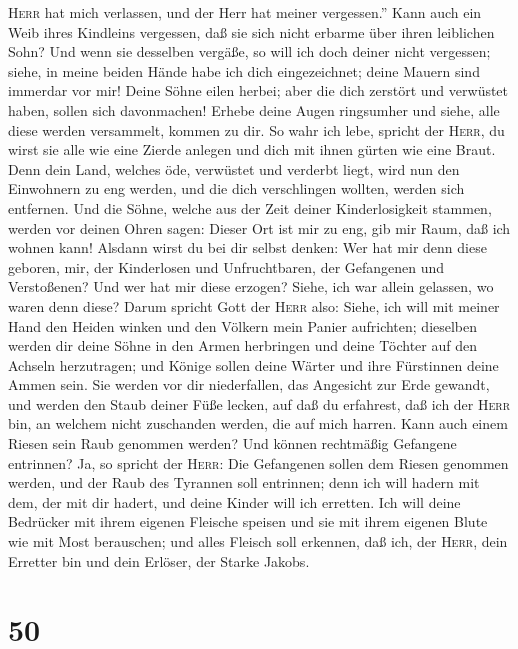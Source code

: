 \textsc{Herr} hat mich verlassen, und der Herr hat meiner vergessen.''
 Kann auch ein Weib ihres Kindleins vergessen, daß sie
sich nicht erbarme über ihren leiblichen Sohn? Und wenn sie desselben
vergäße, so will ich doch deiner nicht vergessen;  siehe,
in meine beiden Hände habe ich dich eingezeichnet; deine Mauern sind
immerdar vor mir!  Deine Söhne eilen herbei; aber die
dich zerstört und verwüstet haben, sollen sich davonmachen!
 Erhebe deine Augen ringsumher und siehe, alle diese
werden versammelt, kommen zu dir. So wahr ich lebe, spricht der
\textsc{Herr}, du wirst sie alle wie eine Zierde anlegen und dich mit
ihnen gürten wie eine Braut.  Denn dein Land, welches
öde, verwüstet und verderbt liegt, wird nun den Einwohnern zu eng
werden, und die dich verschlingen wollten, werden sich entfernen.
 Und die Söhne, welche aus der Zeit deiner
Kinderlosigkeit stammen, werden vor deinen Ohren sagen: Dieser Ort ist
mir zu eng, gib mir Raum, daß ich wohnen kann!  Alsdann
wirst du bei dir selbst denken: Wer hat mir denn diese geboren, mir, der
Kinderlosen und Unfruchtbaren, der Gefangenen und Verstoßenen? Und wer
hat mir diese erzogen? Siehe, ich war allein gelassen, wo waren denn
diese?  Darum spricht Gott der \textsc{Herr} also: Siehe,
ich will mit meiner Hand den Heiden winken und den Völkern mein Panier
aufrichten; dieselben werden dir deine Söhne in den Armen herbringen und
deine Töchter auf den Achseln herzutragen;  und Könige
sollen deine Wärter und ihre Fürstinnen deine Ammen sein. Sie werden vor
dir niederfallen, das Angesicht zur Erde gewandt, und werden den Staub
deiner Füße lecken, auf daß du erfahrest, daß ich der \textsc{Herr} bin,
an welchem nicht zuschanden werden, die auf mich harren. 
Kann auch einem Riesen sein Raub genommen werden? Und können rechtmäßig
Gefangene entrinnen?  Ja, so spricht der \textsc{Herr}:
Die Gefangenen sollen dem Riesen genommen werden, und der Raub des
Tyrannen soll entrinnen; denn ich will hadern mit dem, der mit dir
hadert, und deine Kinder will ich erretten.  Ich will
deine Bedrücker mit ihrem eigenen Fleische speisen und sie mit ihrem
eigenen Blute wie mit Most berauschen; und alles Fleisch soll erkennen,
daß ich, der \textsc{Herr}, dein Erretter bin und dein Erlöser, der
Starke Jakobs.

\hypertarget{section-49}{%
\section{50}\label{section-49}}

